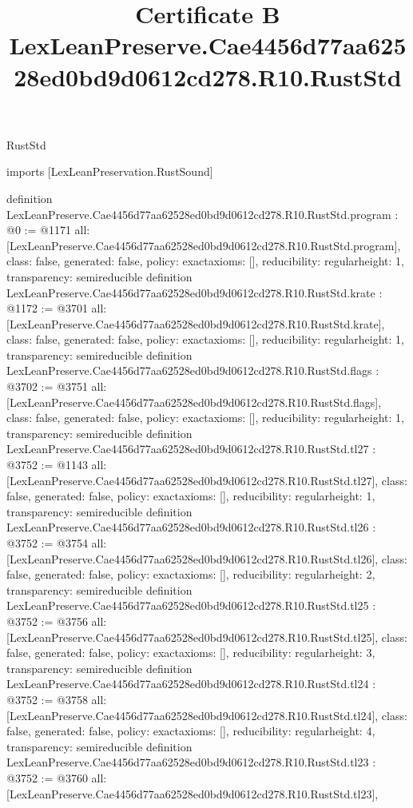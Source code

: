 \begin{lexlean}{RustStd}
\title{Certificate B LexLeanPreserve.Cae4456d77aa62528ed0bd9d0612cd278.R10.RustStd}
\begin{coremodule}
imports [LexLeanPreservation.RustSound]

definition LexLeanPreserve.Cae4456d77aa62528ed0bd9d0612cd278.R10.RustStd.program : @0 := @1171 {
  all: [LexLeanPreserve.Cae4456d77aa62528ed0bd9d0612cd278.R10.RustStd.program],
  class: false,
  generated: false,
  policy: exact{axioms: []},
  reducibility: regular{height: 1},
  transparency: semireducible
}
definition LexLeanPreserve.Cae4456d77aa62528ed0bd9d0612cd278.R10.RustStd.krate : @1172 := @3701 {
  all: [LexLeanPreserve.Cae4456d77aa62528ed0bd9d0612cd278.R10.RustStd.krate],
  class: false,
  generated: false,
  policy: exact{axioms: []},
  reducibility: regular{height: 1},
  transparency: semireducible
}
definition LexLeanPreserve.Cae4456d77aa62528ed0bd9d0612cd278.R10.RustStd.flags : @3702 := @3751 {
  all: [LexLeanPreserve.Cae4456d77aa62528ed0bd9d0612cd278.R10.RustStd.flags],
  class: false,
  generated: false,
  policy: exact{axioms: []},
  reducibility: regular{height: 1},
  transparency: semireducible
}
definition LexLeanPreserve.Cae4456d77aa62528ed0bd9d0612cd278.R10.RustStd.tl27 : @3752 := @1143 {
  all: [LexLeanPreserve.Cae4456d77aa62528ed0bd9d0612cd278.R10.RustStd.tl27],
  class: false,
  generated: false,
  policy: exact{axioms: []},
  reducibility: regular{height: 1},
  transparency: semireducible
}
definition LexLeanPreserve.Cae4456d77aa62528ed0bd9d0612cd278.R10.RustStd.tl26 : @3752 := @3754 {
  all: [LexLeanPreserve.Cae4456d77aa62528ed0bd9d0612cd278.R10.RustStd.tl26],
  class: false,
  generated: false,
  policy: exact{axioms: []},
  reducibility: regular{height: 2},
  transparency: semireducible
}
definition LexLeanPreserve.Cae4456d77aa62528ed0bd9d0612cd278.R10.RustStd.tl25 : @3752 := @3756 {
  all: [LexLeanPreserve.Cae4456d77aa62528ed0bd9d0612cd278.R10.RustStd.tl25],
  class: false,
  generated: false,
  policy: exact{axioms: []},
  reducibility: regular{height: 3},
  transparency: semireducible
}
definition LexLeanPreserve.Cae4456d77aa62528ed0bd9d0612cd278.R10.RustStd.tl24 : @3752 := @3758 {
  all: [LexLeanPreserve.Cae4456d77aa62528ed0bd9d0612cd278.R10.RustStd.tl24],
  class: false,
  generated: false,
  policy: exact{axioms: []},
  reducibility: regular{height: 4},
  transparency: semireducible
}
definition LexLeanPreserve.Cae4456d77aa62528ed0bd9d0612cd278.R10.RustStd.tl23 : @3752 := @3760 {
  all: [LexLeanPreserve.Cae4456d77aa62528ed0bd9d0612cd278.R10.RustStd.tl23],
}
\end{coremodule}
\end{lexlean}
